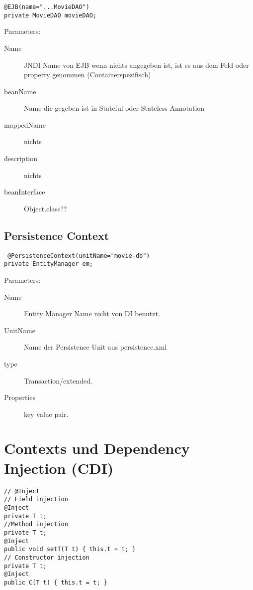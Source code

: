 \documentclass[a4paper,10pt]{scrreprt}
\begin{document}
\begin{lstlisting}[caption=Dependency Injection with Annotation]
 @EJB(name="...MovieDAO")
private MovieDAO movieDAO;
\end{lstlisting}
Parameters: 
\begin{description}
 \item [Name] JNDI Name von EJB wenn nichts angegeben ist, ist es aus dem Feld oder property genommen 
(Containerspezifisch)
\item[beanName] Name die gegeben ist in Stateful oder Stateless Annotation
\item[mappedName] nichts
\item [description] nichts
\item [beanInterface] Object.class??
\end{description}

\subsection{Persistence Context}
\begin{lstlisting}
 @PersistenceContext(unitName="movie-db")
private EntityManager em;
\end{lstlisting}
Parameters:
\begin{description}
 \item [Name] Entity Manager Name nicht von DI benutzt.
 \item [UnitName] Name der Persistence Unit aus persistence.xml
 \item [type] Transaction/extended.
 \item [Properties] key value pair.
\end{description}

\section{Contexts und Dependency Injection (CDI)}

\begin{lstlisting}
// @Inject
// Field injection
@Inject
private T t;
//Method injection
private T t;
@Inject
public void setT(T t) { this.t = t; }
// Constructor injection
private T t;
@Inject
public C(T t) { this.t = t; }
\end{lstlisting}
\end{document}
